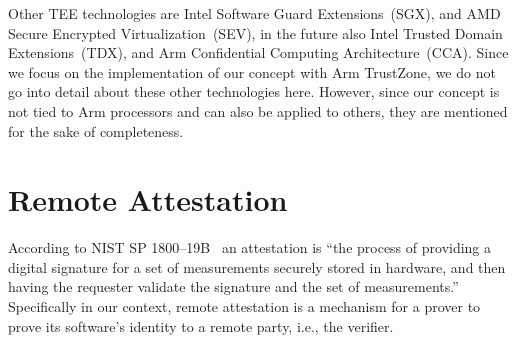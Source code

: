 Other \ac{TEE} technologies are Intel Software Guard Extensions~(SGX), and AMD Secure Encrypted Virtualization~(SEV), in the future also Intel Trusted Domain Extensions~(TDX), and Arm Confidential Computing Architecture~(CCA).
Since we focus on the implementation of our concept with Arm TrustZone, we do not go into detail about these other technologies here.
However, since our concept is not tied to Arm processors and can also be applied to others, they are mentioned for the sake of completeness.





\section{Remote Attestation}


According to NIST SP 1800--19B~\cite{Bartock2022} an attestation is ``the process of providing a digital signature for a set of measurements securely stored in hardware, and then having the requester validate the signature and the set of measurements.''
Specifically in our context, remote attestation is a mechanism for a prover to prove its software's identity to a remote party, i.e., the verifier.





